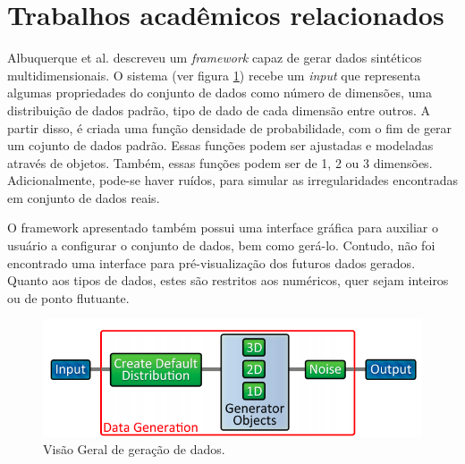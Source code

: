 \documentclass[
	12pt,				%
	openright,			%
	twoside,			%
	a4paper,			%
	english,			%
	brazil				%
	]{abntex2}
\begin{document}
	\section{Trabalhos acadêmicos relacionados}
		Albuquerque et al. \cite{Albuquerque2011} descreveu um \emph{framework} capaz de gerar dados sintéticos multidimensionais.
		O sistema (ver figura \ref{fig:albuquerque}) recebe um \emph{input} que representa algumas propriedades do conjunto de dados como número de dimensões,
			uma distribuição de dados padrão,
			tipo de dado de cada dimensão entre outros.
		A partir disso, é criada uma função densidade de probabilidade, com o fim de gerar um cojunto de dados padrão.
		Essas funções podem ser ajustadas e modeladas através de objetos.
		Também, essas funções podem ser de 1, 2 ou 3 dimensões.
		Adicionalmente, pode-se haver ruídos, para simular as irregularidades encontradas em conjunto de dados reais.
		\par
		O framework apresentado também possui uma interface gráfica para auxiliar o usuário a configurar o conjunto de dados, bem como gerá-lo. Contudo, não foi encontrado uma interface para pré-visualização dos futuros dados gerados. Quanto aos tipos de dados, estes são restritos aos numéricos, quer sejam inteiros ou de ponto flutuante.    
		\begin{figure}[h!]
			\centering
			\includegraphics[width=\linewidth]{./figures/TrabalhosRelacionados/Albuquerque10.png}
			\caption{Visão Geral de geração de dados.}
			\label{fig:albuquerque}
		\end{figure}
\end{document}
